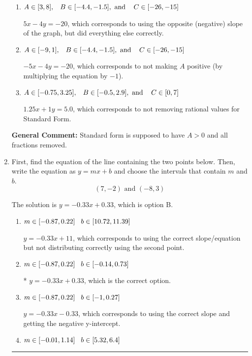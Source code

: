 \documentclass{extbook}[14pt]
\newcommand{\litem}[1]{\item #1

\rule{\textwidth}{0.4pt}}
\begin{document}
\begin{enumerate}
{\begin{enumerate}[label=\Alph*.]
* $5x + 4y = 20$, which is the correct option.
\item \( A \in [3, 8], \hspace{3mm} B \in [-4.4, -1.5], \text{ and } \hspace{3mm} C \in [-26, -15] \)

 $5x - 4y = -20$, which corresponds to using the opposite (negative) slope of the graph, but did everything else correctly.
\item \( A \in [-9, 1], \hspace{3mm} B \in [-4.4, -1.5], \text{ and } \hspace{3mm} C \in [-26, -15] \)

 $-5x - 4y = -20$, which corresponds to not making $A$ positive (by multiplying the equation by $-1$).
\item \( A \in [-0.75, 3.25], \hspace{3mm} B \in [-0.5, 2.9], \text{ and } \hspace{3mm} C \in [0, 7] \)

 $1.25x + 1y = 5.0$, which corresponds to not removing rational values for Standard Form.
\end{enumerate}

\textbf{General Comment:} Standard form is supposed to have $A > 0$ and all fractions removed.
}
\litem{
First, find the equation of the line containing the two points below. Then, write the equation as $ y=mx+b $ and choose the intervals that contain $m$ and $b$.
\[ (7, -2) \text{ and } (-8, 3) \]

The solution is \( y = -0.33x + 0.33 \), which is option B.\begin{enumerate}[label=\Alph*.]
\item \( m \in [-0.87, 0.22] \hspace*{3mm} b \in [10.72, 11.39] \)

 $y = -0.33x + 11$, which corresponds to using the correct slope/equation but not distributing correctly using the second point.
\item \( m \in [-0.87, 0.22] \hspace*{3mm} b \in [-0.14, 0.73] \)

* $y = -0.33x + 0.33$, which is the correct option.
\item \( m \in [-0.87, 0.22] \hspace*{3mm} b \in [-1, 0.27] \)

 $y = -0.33x -0.33$, which corresponds to using the correct slope and getting the negative y-intercept.
\item \( m \in [-0.01, 1.14] \hspace*{3mm} b \in [5.32, 6.4] \)


\end{enumerate}}
\end{enumerate}
\end{document}
